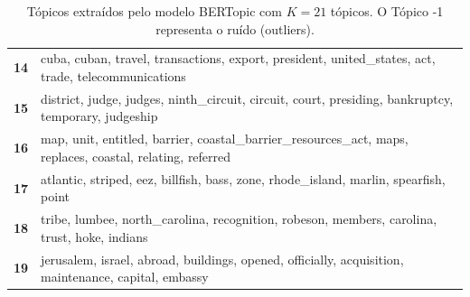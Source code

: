 \begin{table}[htpb]
\begin{tabularx}{\textwidth}{@{}l X@{}}
        \textbf{14} & cuba, cuban, travel, transactions, export, president, united\_states, act, trade, telecommunications \\
        \textbf{15} & district, judge, judges, ninth\_circuit, circuit, court, presiding, bankruptcy, temporary, judgeship \\
        \textbf{16} & map, unit, entitled, barrier, coastal\_barrier\_resources\_act, maps, replaces, coastal, relating, referred \\
        \textbf{17} & atlantic, striped, eez, billfish, bass, zone, rhode\_island, marlin, spearfish, point \\
        \textbf{18} & tribe, lumbee, north\_carolina, recognition, robeson, members, carolina, trust, hoke, indians \\
        \textbf{19} & jerusalem, israel, abroad, buildings, opened, officially, acquisition, maintenance, capital, embassy \\
        \bottomrule
    \end{tabularx}
    \caption{Tópicos extraídos pelo modelo BERTopic com $K=21$ tópicos. O Tópico -1 representa o ruído (outliers).}
    \label{tab:topicos_bertopic_21}
\end{table}
